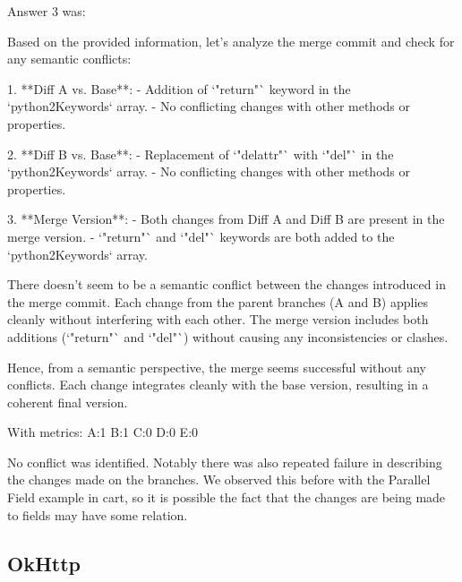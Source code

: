Answer 3 was:
\begin{spverbatim}
Based on the provided information, let's analyze the merge commit and check for any semantic conflicts:

1. **Diff A vs. Base**:
   - Addition of `"return"` keyword in the `python2Keywords` array.
   - No conflicting changes with other methods or properties.

2. **Diff B vs. Base**:
   - Replacement of `"delattr"` with `"del"` in the `python2Keywords` array.
   - No conflicting changes with other methods or properties.

3. **Merge Version**:
   - Both changes from Diff A and Diff B are present in the merge version.
   - `"return"` and `"del"` keywords are both added to the `python2Keywords` array.

There doesn't seem to be a semantic conflict between the changes introduced in the merge commit. Each change from the parent branches (A and B) applies cleanly without interfering with each other. The merge version includes both additions (`"return"` and `"del"`) without causing any inconsistencies or clashes.

Hence, from a semantic perspective, the merge seems successful without any conflicts. Each change integrates cleanly with the base version, resulting in a coherent final version.
\end{spverbatim}

With metrics:
A:1
B:1
C:0
D:0
E:0

No conflict was identified. Notably there was also repeated failure in describing the changes made on the branches. We observed this before with the Parallel Field example in cart, so it is possible the fact that the changes are being made to fields may have some relation.

\subsection{OkHttp}

